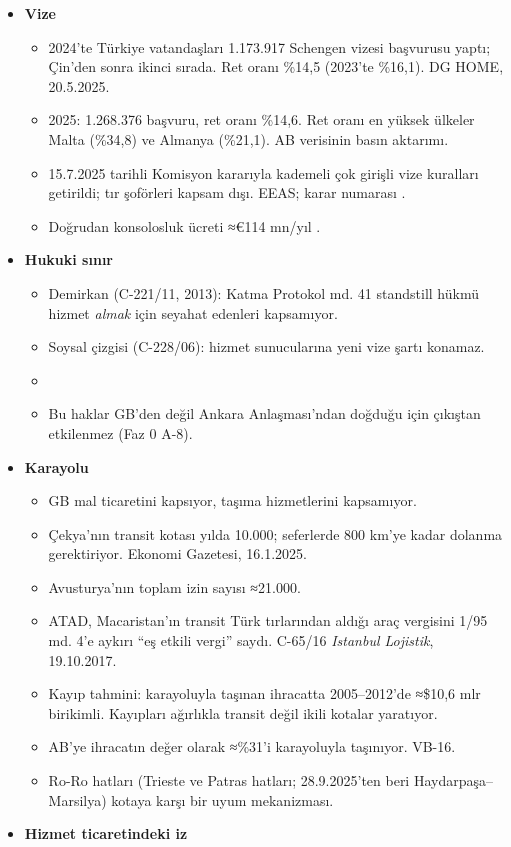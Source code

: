 \begin{itemize}
\tightlist
\item
  \textbf{Vize}

  \begin{itemize}
  \tightlist
  \item
    2024'te Türkiye vatandaşları 1.173.917 Schengen vizesi başvurusu yaptı; Çin'den sonra ikinci sırada. Ret oranı \%14,5 (2023'te \%16,1). \etiketV{} DG HOME, 20.5.2025.
  \item
    2025: 1.268.376 başvuru, ret oranı \%14,6. Ret oranı en yüksek ülkeler Malta (\%34,8) ve Almanya (\%21,1). \etiketD{} AB verisinin basın aktarımı.
  \item
    15.7.2025 tarihli Komisyon kararıyla kademeli çok girişli vize kuralları getirildi; tır şoförleri kapsam dışı. \etiketV{} EEAS; karar numarası \etiketD{}.
  \item
    Doğrudan konsolosluk ücreti ≈€114 mn/yıl \etiketT{}.
  \end{itemize}
\item
  \textbf{Hukuki sınır}

  \begin{itemize}
  \tightlist
  \item
    Demirkan (C-221/11, 2013): Katma Protokol md. 41 standstill hükmü hizmet \emph{almak} için seyahat edenleri kapsamıyor.
  \item
    Soysal çizgisi (C-228/06): hizmet sunucularına yeni vize şartı konamaz.
  \item
    \etiketV{}
  \item
    Bu haklar GB'den değil Ankara Anlaşması'ndan doğduğu için çıkıştan etkilenmez (Faz 0 A-8).
  \end{itemize}
\item
  \textbf{Karayolu}

  \begin{itemize}
  \tightlist
  \item
    GB mal ticaretini kapsıyor, taşıma hizmetlerini kapsamıyor.
  \item
    Çekya'nın transit kotası yılda 10.000; seferlerde 800 km'ye kadar dolanma gerektiriyor. \etiketV{} Ekonomi Gazetesi, 16.1.2025.
  \item
    Avusturya'nın toplam izin sayısı ≈21.000. \etiketD{}
  \item
    ATAD, Macaristan'ın transit Türk tırlarından aldığı araç vergisini 1/95 md. 4'e aykırı ``eş etkili vergi'' saydı. \etiketV{} C-65/16 \emph{Istanbul Lojistik}, 19.10.2017.
  \item
    Kayıp tahmini: karayoluyla taşınan ihracatta 2005--2012'de ≈\$10,6 mlr birikimli. Kayıpları ağırlıkla transit değil ikili kotalar yaratıyor. \etiketD{}
  \item
    AB'ye ihracatın değer olarak ≈\%31'i karayoluyla taşınıyor. \etiketD{} VB-16.
  \item
    Ro-Ro hatları (Trieste ve Patras hatları; 28.9.2025'ten beri Haydarpaşa--Marsilya) kotaya karşı bir uyum mekanizması. \etiketD{}
  \end{itemize}
\item
  \textbf{Hizmet ticaretindeki iz}


\end{itemize}
